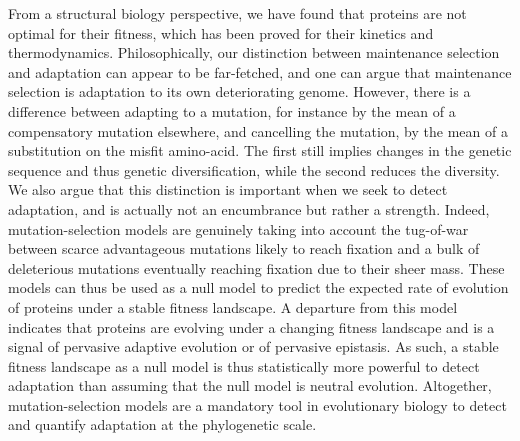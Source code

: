 \documentclass{article}
\begin{document}
    From a structural biology perspective, we have found that proteins are not optimal for their fitness, which has been proved for their kinetics and thermodynamics\cite{taverna_why_2002, goldstein_evolution_2011}.
    Philosophically, our distinction between maintenance selection and adaptation can appear to be far-fetched, and one can argue that maintenance selection is adaptation to its own deteriorating genome.
    However, there is a difference between adapting to a mutation, for instance by the mean of a compensatory mutation elsewhere, and cancelling the mutation, by the mean of a substitution on the misfit amino-acid.
    The first still implies changes in the genetic sequence and thus genetic diversification, while the second reduces the diversity.
    We also argue that this distinction is important when we seek to detect adaptation, and is actually not an encumbrance but rather a strength.
    Indeed, mutation-selection models are genuinely taking into account the tug-of-war between scarce advantageous mutations likely to reach fixation and a bulk of deleterious mutations eventually reaching fixation due to their sheer mass.
    These models can thus be used as a null model to predict the expected rate of evolution of proteins\cite{spielman_relationship_2015, dosreis_how_2015} under a stable fitness landscape.
    A departure from this model indicates that proteins are evolving under a changing fitness landscape\cite{rodrigue_detecting_2017, tamuri_mutationselection_2021} and is a signal of pervasive adaptive evolution\cite{rodrigue_bayesian_2021} or of pervasive epistasis\cite{rodrigue_detecting_2017}.
    As such, a stable fitness landscape as a null model is thus statistically more powerful to detect adaptation than assuming that the null model is neutral evolution.
    Altogether, mutation-selection models are a mandatory tool in evolutionary biology to detect and quantify adaptation at the phylogenetic scale.
\end{document}
